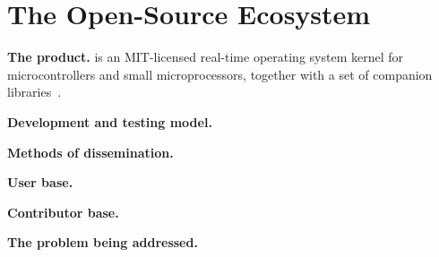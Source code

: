 \section{The \ose{} Open-Source Ecosystem}


\noindent\textbf{The product.}
\ose{} is an MIT-licensed real-time operating system kernel for microcontrollers and small microprocessors, together with a set of companion libraries~\cite{freertos}.

\noindent\textbf{Development and testing model.}

\noindent\textbf{Methods of dissemination.}

\noindent\textbf{User base.}

\noindent\textbf{Contributor base.}

\noindent\textbf{The problem being addressed.}
